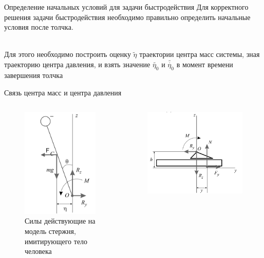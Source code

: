 \documentclass[10pt]{beamer}
\begin{document}
\begin{frame}{Определение начальных условий для задачи быстродействия}
	Для корректного решения задачи быстродействия необходимо правильно определить начальные условия после толчка.
	
	\hfill \\
	Для этого необходимо построить оценку $\tilde{\eta}$ траектории центра масс системы, зная траекторию центра давления,
	и взять значение $\tilde{\eta_0}$ и $\tilde{\dot{\eta_0}}$ в момент времени завершения толчка

\end{frame}

\begin{frame}{Связь центра масс и центра давления\cite{mechmodel}}
		\begin{columns}
		\begin{figure}[h!]
			\includegraphics[width=0.7\linewidth]{images/body_1.png}
			\caption{Силы действующие на модель стержня, имитирующего тело человека}
		\end{figure}
		\begin{figure}[h!]
			\includegraphics[width=0.8\linewidth]{images/foot.png}

\end{figure}
\end{columns}
\end{frame}
\end{document}
